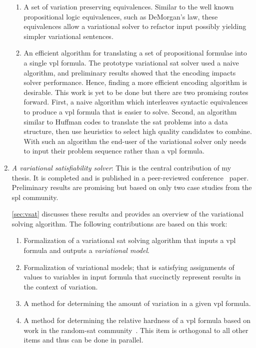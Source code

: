 \begin{enumerate}
  \begin{enumerate}
  \item \checkmark{} A set of variation preserving equivalences. Similar to the well known
    propositional logic equivalences, such as DeMorgan's law, these equivalences
    allow a variational solver to refactor input possibly yielding simpler
    variational sentences.
  \item\label{encoding-strat-deliverable} An efficient algorithm for translating
    a set of propositional formulae into a single \ac{vpl} formula. The
    prototype variational \ac{sat} solver used a naive algorithm, and
    preliminary results showed that the encoding impacts solver performance.
    Hence, finding a more efficient encoding algorithm is desirable. This work
    is yet to be done but there are two promising routes forward. First, a naive
    algorithm which interleaves syntactic equivalences to produce a \ac{vpl}
    formula that is easier to solve. Second, an algorithm similar to Huffman
    codes\cite{4051119} to translate the \ac{sat} problems into a data
    structure, then use heuristics to select high quality candidates to combine.
    With such an algorithm the end-user of the variational solver only needs to
    input their problem sequence rather than a \ac{vpl} formula.
  \end{enumerate}

\item\label{vsat-deliverable} \emph{A variational satisfiability solver}: This
  is the central contribution of my thesis. It is completed and is published in
  a peer-reviewed conference~\cite{10.1145/3382025.3414965} paper. Preliminary
  results are promising but based on only two case studies from the \ac{spl}
  community.

  \autoref{sec:vsat} discusses these results and provides an overview of the
  variational solving algorithm. The following contributions are based on this
  work:
  \begin{enumerate}
  \item \checkmark{} Formalization of a variational \ac{sat} solving algorithm
    that inputs a \ac{vpl} formula and outputs a \emph{variational model}.
  \item \checkmark{} Formalization of variational models; that is satisfying
    assignments of values to variables in input formula that succinctly
    represent results in the context of variation.
  \item \checkmark{} A method for determining the amount of variation in a given
    \ac{vpl} formula.
  \item\label{phase-change-deliverable} A method for determining the relative
    hardness of a \ac{vpl} formula based on work in the random-\ac{sat}
    community~\cite{Gent94thesat}. This item is orthogonal to all other items
    and thus can be done in parallel.
  \end{enumerate}


\end{enumerate}
